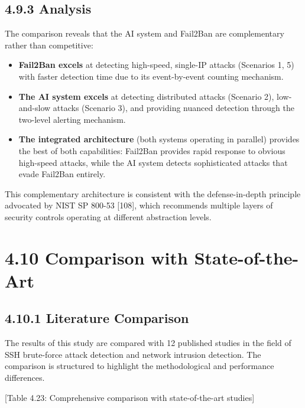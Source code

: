 \documentclass[
  a4paper]{report}
\providecommand{\tightlist}{%
  \setlength{\itemsep}{0pt}\setlength{\parskip}{0pt}}
\begin{document}
\subsection{4.9.3 Analysis}\label{analysis}

The comparison reveals that the AI system and Fail2Ban are complementary
rather than competitive:

\begin{itemize}
\tightlist
\item
  \textbf{Fail2Ban excels} at detecting high-speed, single-IP attacks
  (Scenarios 1, 5) with faster detection time due to its event-by-event
  counting mechanism.
\item
  \textbf{The AI system excels} at detecting distributed attacks
  (Scenario 2), low-and-slow attacks (Scenario 3), and providing nuanced
  detection through the two-level alerting mechanism.
\item
  \textbf{The integrated architecture} (both systems operating in
  parallel) provides the best of both capabilities: Fail2Ban provides
  rapid response to obvious high-speed attacks, while the AI system
  detects sophisticated attacks that evade Fail2Ban entirely.
\end{itemize}

This complementary architecture is consistent with the defense-in-depth
principle advocated by NIST SP 800-53 {[}108{]}, which recommends
multiple layers of security controls operating at different abstraction
levels.

\section{4.10 Comparison with
State-of-the-Art}\label{comparison-with-state-of-the-art}

\subsection{4.10.1 Literature Comparison}\label{literature-comparison}

The results of this study are compared with 12 published studies in the
field of SSH brute-force attack detection and network intrusion
detection. The comparison is structured to highlight the methodological
and performance differences.

{[}Table 4.23: Comprehensive comparison with state-of-the-art studies{]}
\end{document}
